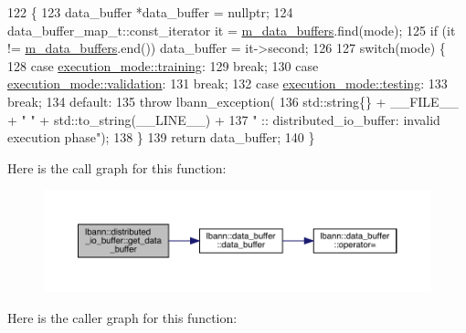 \begin{DoxyCode}
122                                                                 \{
123     data\_buffer *data\_buffer = \textcolor{keyword}{nullptr};
124     data\_buffer\_map\_t::const\_iterator it = \hyperlink{classlbann_1_1distributed__io__buffer_a59ef8621c57755f73671b782e11dbe89}{m\_data\_buffers}.find(mode);
125     \textcolor{keywordflow}{if} (it != \hyperlink{classlbann_1_1distributed__io__buffer_a59ef8621c57755f73671b782e11dbe89}{m\_data\_buffers}.end()) data\_buffer = it->second;
126 
127     \textcolor{keywordflow}{switch}(mode) \{
128     \textcolor{keywordflow}{case} \hyperlink{base_8hpp_a2781a159088df64ed7d47cc91c4dc0a8ac185ddac8b5a8f5aa23c5b80bc12d214}{execution\_mode::training}:
129       \textcolor{keywordflow}{break};
130     \textcolor{keywordflow}{case} \hyperlink{base_8hpp_a2781a159088df64ed7d47cc91c4dc0a8aa617908b172c473cb8e8cda059e55bf0}{execution\_mode::validation}:
131       \textcolor{keywordflow}{break};
132     \textcolor{keywordflow}{case} \hyperlink{base_8hpp_a2781a159088df64ed7d47cc91c4dc0a8aae2b1fca515949e5d54fb22b8ed95575}{execution\_mode::testing}:
133       \textcolor{keywordflow}{break};
134     \textcolor{keywordflow}{default}:
135       \textcolor{keywordflow}{throw} lbann\_exception(
136                             std::string\{\} + \_\_FILE\_\_ + \textcolor{stringliteral}{" "} + std::to\_string(\_\_LINE\_\_) +
137                             \textcolor{stringliteral}{" :: distributed\_io\_buffer: invalid execution phase"});
138     \}
139     \textcolor{keywordflow}{return} data\_buffer;
140   \}
\end{DoxyCode}
Here is the call graph for this function\+:\nopagebreak
\begin{figure}[H]
\begin{center}
\leavevmode
\includegraphics[width=350pt]{classlbann_1_1distributed__io__buffer_ac176f3fced1191534a985f831136aa3e_cgraph}
\end{center}
\end{figure}
Here is the caller graph for this function\+:\nopagebreak
